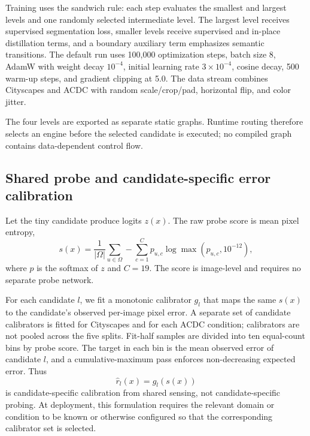 \documentclass[a4paper,review,12pt]{elsarticle}
\begin{document}
Training uses the sandwich rule: each step evaluates the smallest and largest levels and one randomly selected intermediate level. The largest level receives supervised segmentation loss, smaller levels receive supervised and in-place distillation terms, and a boundary auxiliary term emphasizes semantic transitions. The default run uses 100,000 optimization steps, batch size 8, AdamW with weight decay $10^{-4}$, initial learning rate $3\times10^{-4}$, cosine decay, 500 warm-up steps, and gradient clipping at 5.0. The data stream combines Cityscapes and ACDC with random scale/crop/pad, horizontal flip, and color jitter.

The four levels are exported as separate static graphs. Runtime routing therefore selects an engine before the selected candidate is executed; no compiled graph contains data-dependent control flow.

\subsection{Shared probe and candidate-specific error calibration}
\label{sec:calibration}

Let the tiny candidate produce logits $z(x)$. The raw probe score is mean pixel entropy,
\begin{equation}
s(x)=\frac{1}{|\Omega|}\sum_{u\in\Omega}-\sum_{c=1}^{C}p_{u,c}\log\max(p_{u,c},10^{-12}),
\label{eq:entropy}
\end{equation}
where $p$ is the softmax of $z$ and $C=19$. The score is image-level and requires no separate probe network.

For each candidate $l$, we fit a monotonic calibrator $g_l$ that maps the same $s(x)$ to the candidate's observed per-image pixel error. A separate set of candidate calibrators is fitted for Cityscapes and for each ACDC condition; calibrators are not pooled across the five splits. Fit-half samples are divided into ten equal-count bins by probe score. The target in each bin is the mean observed error of candidate $l$, and a cumulative-maximum pass enforces non-decreasing expected error. Thus
\begin{equation}
\widehat{r}_l(x)=g_l(s(x))
\label{eq:risk}
\end{equation}
is candidate-specific calibration from shared sensing, not candidate-specific probing. At deployment, this formulation requires the relevant domain or condition to be known or otherwise configured so that the corresponding calibrator set is selected.
\end{document}
